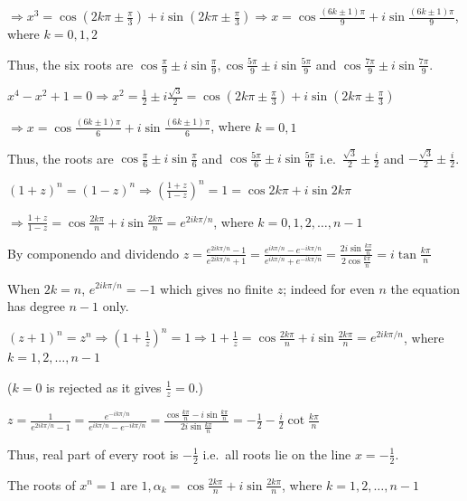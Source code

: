   $\Rightarrow x^3 = \cos\left(2k\pi\pm\frac{\pi}{3}\right) + i\sin\left(2k\pi\pm\frac{\pi}{3}\right)
  \Rightarrow x = \cos\frac{(6k\pm1)\pi}{9} + i\sin\frac{(6k\pm1)\pi}{9}$, where $k = 0, 1, 2$

  Thus, the six roots are $\cos\frac{\pi}{9}\pm i\sin\frac{\pi}{9}, \cos\frac{5\pi}{9}\pm
  i\sin\frac{5\pi}{9}$ and $\cos\frac{7\pi}{9}\pm i\sin\frac{7\pi}{9}$.
\item $x^4 - x^2 + 1 = 0 \Rightarrow x^2 = \frac{1}{2}\pm i\frac{\sqrt{3}}{2} = \cos\left(2k\pi\pm
  \frac{\pi}{3}\right) + i\sin\left(2k\pi\pm\frac{\pi}{3}\right)$

  $\Rightarrow x = \cos\frac{(6k\pm1)\pi}{6} + i\sin\frac{(6k\pm1)\pi}{6}$, where $k = 0, 1$

  Thus, the roots are $\cos\frac{\pi}{6}\pm i\sin\frac{\pi}{6}$ and $\cos\frac{5\pi}{6}\pm
  i\sin\frac{5\pi}{6}$ i.e.\ $\frac{\sqrt{3}}{2}\pm\frac{i}{2}$ and $-\frac{\sqrt{3}}{2}\pm\frac{i}{2}$.
\item $(1 + z)^n = (1 - z)^n \Rightarrow \left(\frac{1 + z}{1 - z}\right)^n = 1 = \cos2k\pi + i\sin2k\pi$

  $\Rightarrow \frac{1 + z}{1 - z} = \cos\frac{2k\pi}{n} + i\sin\frac{2k\pi}{n} = e^{2ik\pi/n}$, where $k =
  0, 1, 2, \ldots, n - 1$

  By componendo and dividendo $z = \frac{e^{2ik\pi/n} - 1}{e^{2ik\pi/n} + 1} = \frac{e^{ik\pi/n} -
    e^{-ik\pi/n}}{e^{ik\pi/n} + e^{-ik\pi/n}} = \frac{2i\sin\frac{k\pi}{n}}{2\cos\frac{k\pi}{n}} =
  i\tan\frac{k\pi}{n}$

  When $2k = n$, $e^{2ik\pi/n} = -1$ which gives no finite $z$; indeed for even $n$ the equation has degree $n
  - 1$ only.
\item $(z + 1)^n = z^n \Rightarrow \left(1 + \frac{1}{z}\right)^n = 1 \Rightarrow 1 + \frac{1}{z} =
  \cos\frac{2k\pi}{n} + i\sin\frac{2k\pi}{n} = e^{2ik\pi/n}$, where $k = 1, 2, \ldots, n - 1$

  ($k = 0$ is rejected as it gives $\frac{1}{z} = 0$.)

  $z = \frac{1}{e^{2ik\pi/n} - 1} = \frac{e^{-ik\pi/n}}{e^{ik\pi/n} - e^{-ik\pi/n}} = \frac{\cos\frac{k\pi}{n}
    - i\sin\frac{k\pi}{n}}{2i\sin\frac{k\pi}{n}} = -\frac{1}{2} - \frac{i}{2}\cot\frac{k\pi}{n}$

  Thus, real part of every root is $-\frac{1}{2}$ i.e.\ all roots lie on the line $x = -\frac{1}{2}$.
\item The roots of $x^n = 1$ are $1, \alpha_k = \cos\frac{2k\pi}{n} + i\sin\frac{2k\pi}{n}$, where $k = 1, 2,
  \ldots, n - 1$

